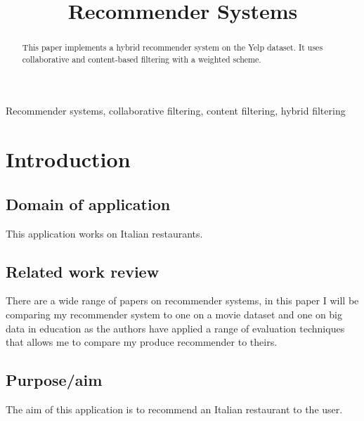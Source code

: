 \documentclass[conference]{IEEEtran}
\begin{document}
\title{Recommender Systems}

\author{

}

\maketitle

\begin{abstract}
    This paper implements a hybrid recommender system on the Yelp dataset. It uses collaborative and content-based filtering with a weighted scheme.
\end{abstract}

\begin{IEEEkeywords}
    Recommender systems, collaborative filtering, content filtering, hybrid filtering
\end{IEEEkeywords}

\section{Introduction}

\subsection{Domain of application}

This application works on Italian restaurants.

\subsection{Related work review}

There are a wide range of papers on recommender systems, in this paper I will be comparing my recommender system to one on a movie dataset \cite{evaluation} and one on big data in education \cite{dwivedi2017recommender} as the authors have applied a range of evaluation techniques that allows me to compare my produce recommender to theirs.

\subsection{Purpose/aim}

The aim of this application is to recommend an Italian restaurant to the user.
\end{document}
